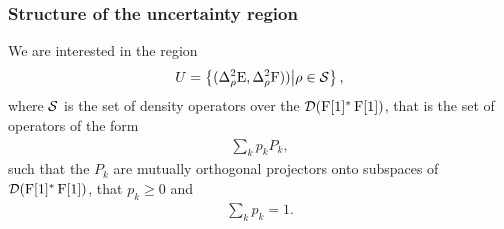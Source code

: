 


\subsubsection{Structure of the uncertainty region}

We are interested in the region
\begin{align}
  U = \left\{(\varr{\ope}, \varr{\opf}))\middle|\rho\in \dops\right\},
\end{align}
where $\dops$ is the set of density operators over the $\mathcal{D}(\operatorname{F}[1]^*\operatorname{F}[1])$, that is the set of operators of the form
\begin{align}
  \sum_k p_k P_k,
\end{align}
such that the $P_k$ are mutually orthogonal projectors onto subspaces of $\mathcal{D}(\operatorname{F}[1]^*\operatorname{F}[1])$, that $p_k\geq 0$ and
\begin{align}
  \sum_k p_k = 1.
\end{align}

